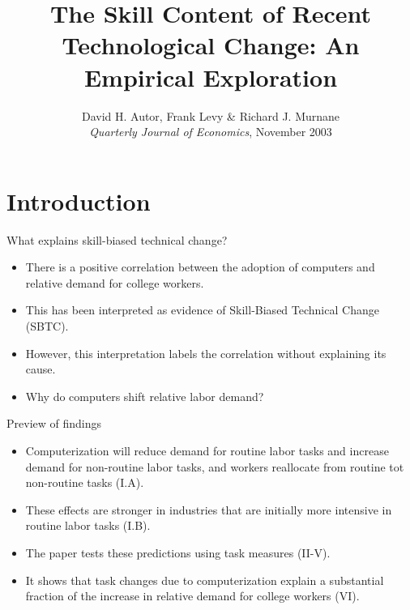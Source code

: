 \documentclass[notes=show]{beamer}
\begin{document}
\title[The Skill Content]{The Skill Content of Recent Technological Change: An Empirical Exploration}
\subtitle{}
\date{David H. Autor, Frank Levy \& Richard J. Murnane\bigskip \\
\textit{Quarterly Journal of Economics}, November 2003}
\author{}
\maketitle

\section{Introduction}

\begin{frame}{What explains skill-biased technical change?}
\begin{itemize}
\item There is a positive correlation between the adoption of computers and relative demand for college workers.\medskip
\item This has been interpreted as evidence of Skill-Biased Technical Change (SBTC). \medskip
\item However, this interpretation labels the correlation without explaining its cause.\medskip
\item Why do computers shift relative labor demand?
\end{itemize}
\end{frame}

\begin{frame}{Preview of findings}
\begin{itemize}
\item Computerization will reduce demand for routine labor tasks and increase demand for non-routine labor tasks, and workers reallocate from routine tot non-routine tasks (I.A). \medskip
\item These effects are stronger in industries that are initially more intensive in routine labor tasks (I.B). \medskip
\item The paper tests these predictions using task measures (II-V). \medskip
\item It shows that task changes due to computerization explain a substantial fraction of the increase in relative demand for college workers (VI).
\end{itemize}
\end{frame}
\end{document}
